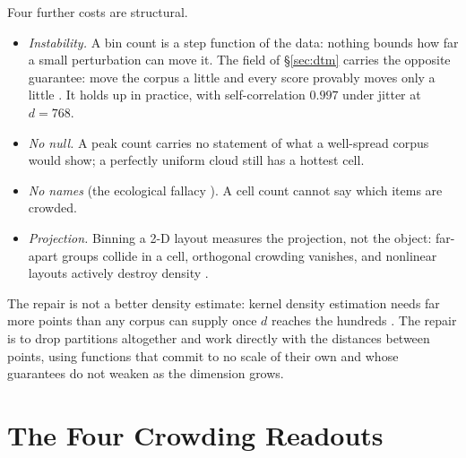 \documentclass[11pt,letterpaper]{article}
\begin{document}
Four further costs are structural.
\begin{itemize}
\item \emph{Instability.} A bin count is a step function of the data:
  nothing bounds how far a small perturbation can move it. The field of \S\ref{sec:dtm} carries the opposite guarantee: move
  the corpus a little and every score provably moves only a little
  \cite{chazal2011}. It holds up in practice, with self-correlation
  $0.997$ under jitter at $d{=}768$.
\item \emph{No null.} A peak count carries no statement of what a
  well-spread corpus would show; a perfectly uniform cloud still has a
  hottest cell.
\item \emph{No names} (the ecological fallacy \cite{robinson1950}). A
  cell count cannot say which items are crowded.
\item \emph{Projection.} Binning a 2-D layout measures the projection,
  not the object: far-apart groups collide in a cell, orthogonal
  crowding vanishes, and nonlinear layouts actively destroy density
  \cite{wattenberg2016}.
\end{itemize}
The repair is not a better density estimate: kernel density estimation
needs far more points than any corpus can supply once $d$ reaches the
hundreds \cite{silverman1986}. The repair is to drop partitions altogether
and work directly with the distances between points, using functions that
commit to no scale of their own and whose guarantees do not weaken as the
dimension grows.

\section{The Four Crowding Readouts}
\label{sec:continuous}
\end{document}
